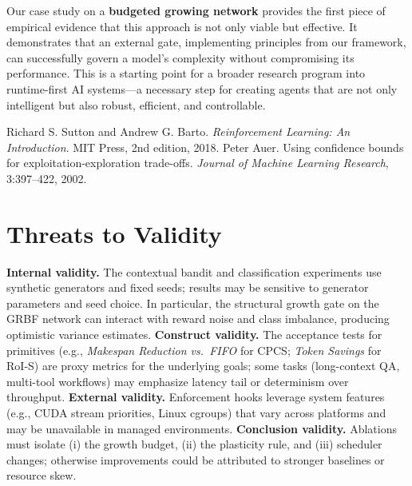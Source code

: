 \documentclass[
]{article}
\begin{document}
Our case study on a \textbf{budgeted growing network} provides the first
piece of empirical evidence that this approach is not only viable but
effective. It demonstrates that an external gate, implementing
principles from our framework, can successfully govern a model's
complexity without compromising its performance. This is a starting
point for a broader research program into runtime-first AI systems---a
necessary step for creating agents that are not only intelligent but
also robust, efficient, and controllable.

\begin{thebibliography}{9}
 Richard S. Sutton and Andrew G. Barto. \emph{Reinforcement Learning: An Introduction}. MIT Press, 2nd edition, 2018.
 Peter Auer. Using confidence bounds for exploitation-exploration trade-offs. \emph{Journal of Machine Learning Research}, 3:397--422, 2002.
\end{thebibliography}

\section*{Threats to Validity}
\textbf{Internal validity.} The contextual bandit and classification experiments use synthetic generators and fixed seeds; results may be sensitive to generator parameters and seed choice. In particular, the structural growth gate on the GRBF network can interact with reward noise and class imbalance, producing optimistic variance estimates. \textbf{Construct validity.} The acceptance tests for primitives (e.g., \emph{Makespan Reduction vs.\ FIFO} for CPCS; \emph{Token Savings} for RoI‑S) are proxy metrics for the underlying goals; some tasks (long-context QA, multi-tool workflows) may emphasize latency tail or determinism over throughput. \textbf{External validity.} Enforcement hooks leverage system features (e.g., CUDA stream priorities, Linux cgroups) that vary across platforms and may be unavailable in managed environments. \textbf{Conclusion validity.} Ablations must isolate (i) the growth budget, (ii) the plasticity rule, and (iii) scheduler changes; otherwise improvements could be attributed to stronger baselines or resource skew.
\end{document}
